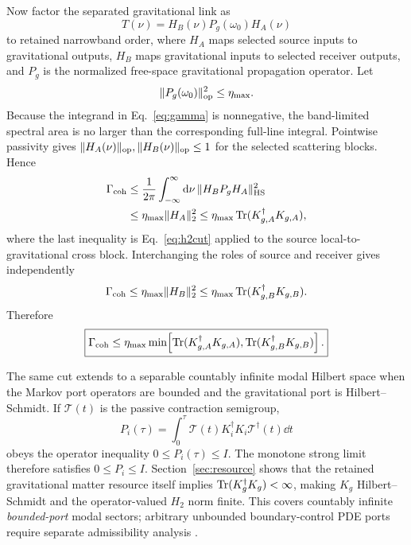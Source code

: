 Now factor the separated gravitational link as
\begin{equation}
T(\nu)=H_B(\nu)P_g(\omega_0)H_A(\nu)
\label{eq:factor}
\end{equation}
to retained narrowband order, where $H_A$ maps selected source inputs to gravitational outputs, $H_B$ maps gravitational inputs to selected receiver outputs, and $P_g$ is the normalized free-space gravitational propagation operator. Let
\begin{equation}
\|P_g(\omega_0)\|_{\mathrm{op}}^2\le\eta_{\max}.
\end{equation}
Because the integrand in Eq.~\eqref{eq:gamma} is nonnegative, the band-limited spectral area is no larger than the corresponding full-line integral. Pointwise passivity gives $\|H_A(\nu)\|_{\mathrm{op}},\|H_B(\nu)\|_{\mathrm{op}}\le1$ for the selected scattering blocks. Hence
\begin{align}
\Gamma_{\rm coh}
&\le \frac{1}{2\pi}\int_{-\infty}^{\infty}\mathrm d\nu\,
\|H_B P_g H_A\|_{\mathrm{HS}}^2 \\
&\le \eta_{\max}\|H_A\|_2^2
\le \eta_{\max}\operatorname{Tr}(K_{g,A}^\dagger K_{g,A}),
\label{eq:sourcecut}
\end{align}
where the last inequality is Eq.~\eqref{eq:h2cut} applied to the source local-to-gravitational cross block. Interchanging the roles of source and receiver gives independently
\begin{equation}
\Gamma_{\rm coh}
\le \eta_{\max}\|H_B\|_2^2
\le \eta_{\max}\operatorname{Tr}(K_{g,B}^\dagger K_{g,B}).
\label{eq:receivercut}
\end{equation}
Therefore
\begin{equation}
\boxed{
\Gamma_{\rm coh}
\le
\eta_{\max}
\min\!\left[
\operatorname{Tr}(K_{g,A}^\dagger K_{g,A}),
\operatorname{Tr}(K_{g,B}^\dagger K_{g,B})
\right].
}
\label{eq:gravcut}
\end{equation}

The same cut extends to a separable countably infinite modal Hilbert space when the Markov port operators are bounded and the gravitational port is Hilbert--Schmidt. If $\mathcal T(t)$ is the passive contraction semigroup,
\begin{equation}
P_i(\tau)=\int_0^\tau
\mathcal T(t)K_i^\dagger K_i\mathcal T^\dagger(t)\dd t
\end{equation}
obeys the operator inequality $0\le P_i(\tau)\le I$. The monotone strong limit therefore satisfies $0\le P_i\le I$. Section~\ref{sec:resource} shows that the retained gravitational matter resource itself implies $\operatorname{Tr}(K_g^\dagger K_g)<\infty$, making $K_g$ Hilbert--Schmidt and the operator-valued $H_2$ norm finite. This covers countably infinite \emph{bounded-port} modal sectors; arbitrary unbounded boundary-control PDE ports require separate admissibility analysis \cite{BarasBrockett1975,Opmeer2013}.
